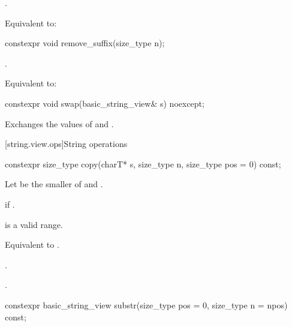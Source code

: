 \begin{itemdescr}
\pnum
\expects
{}.

\pnum
\effects
Equivalent to: 
\end{itemdescr}

%
\begin{itemdecl}
constexpr void remove_suffix(size_type n);
\end{itemdecl}

\begin{itemdescr}
\pnum
\expects
{}.

\pnum
\effects
Equivalent to: 
\end{itemdescr}

%
\begin{itemdecl}
constexpr void swap(basic_string_view& s) noexcept;
\end{itemdecl}

\begin{itemdescr}
\pnum
\effects
Exchanges the values of  and .
\end{itemdescr}

[string.view.ops]{String operations}

%
\begin{itemdecl}
constexpr size_type copy(charT* s, size_type n, size_type pos = 0) const;
\end{itemdecl}

\begin{itemdescr}
\pnum
Let  be the smaller of  and .

\pnum
\throws
{} if .

\pnum
\expects
{} is a valid range.

\pnum
\effects
Equivalent to .

\pnum
\returns
{}.

\pnum
\complexity
{}.
\end{itemdescr}

%
\begin{itemdecl}
constexpr basic_string_view substr(size_type pos = 0, size_type n = npos) const;
\end{itemdecl}

